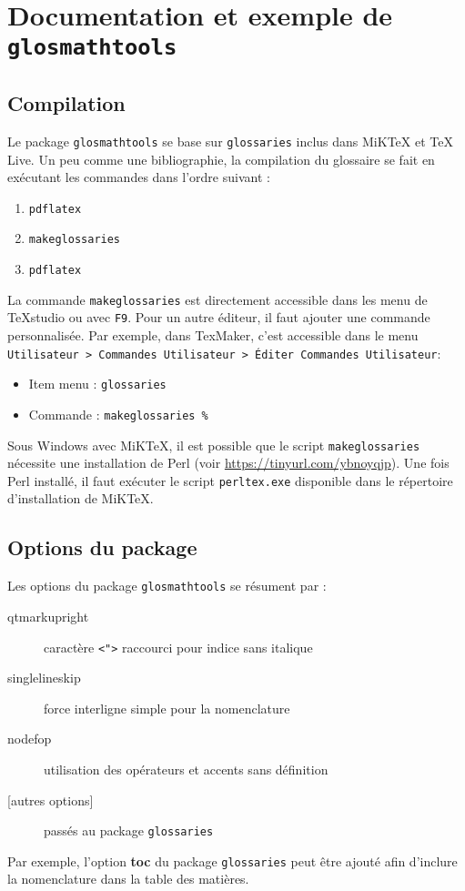 \documentclass[projet,nohyperref,article,english,french]{ulthese}
\begin{document}
\frontmatter         
\frontispice

\printglossary[title=Nomenclature]

\mainmatter                     

\chapter{Documentation et exemple de \texttt{glosmathtools}}

\section{Compilation}
Le package \texttt{glosmathtools} se base sur \texttt{glossaries} inclus dans MiKTeX et TeX Live. Un peu comme une bibliographie, la compilation du glossaire se fait en exécutant les commandes dans l'ordre suivant :
\begin{enumerate}
	\item \texttt{pdflatex}
	\item \texttt{makeglossaries}
	\item \texttt{pdflatex}
\end{enumerate}
La commande \texttt{makeglossaries} est directement accessible dans les menu de TeXstudio ou avec \texttt{F9}. Pour un autre éditeur, il faut ajouter une commande personnalisée. Par exemple, dans TexMaker, c’est accessible dans le menu \texttt{Utilisateur > Commandes Utilisateur > Éditer Commandes Utilisateur}:
\begin{itemize}
	\item Item menu : \texttt{glossaries} 
	\item Commande : \texttt{makeglossaries \%}
\end{itemize}
Sous Windows avec MiKTeX, il est possible que le script \texttt{makeglossaries} nécessite une installation de Perl (voir \url{https://tinyurl.com/ybnoyqjp}). Une fois Perl installé, il faut exécuter le script \texttt{perltex.exe} disponible dans le répertoire d'installation de MiKTeX.

\section{Options du package}
Les options du package \texttt{glosmathtools} se résument par :
\begin{description}
	\item[qtmarkupright] caractère \texttt{<">} raccourci pour indice sans italique
	\item[singlelineskip] force interligne simple pour la nomenclature
	\item[nodefop] utilisation des opérateurs et accents sans définition
	\item[{[autres options]}] passés au package \texttt{glossaries}
\end{description}
Par exemple, l'option \textbf{toc} du package \texttt{glossaries} peut être ajouté afin d'inclure la nomenclature dans la table des matières.
\end{document}

